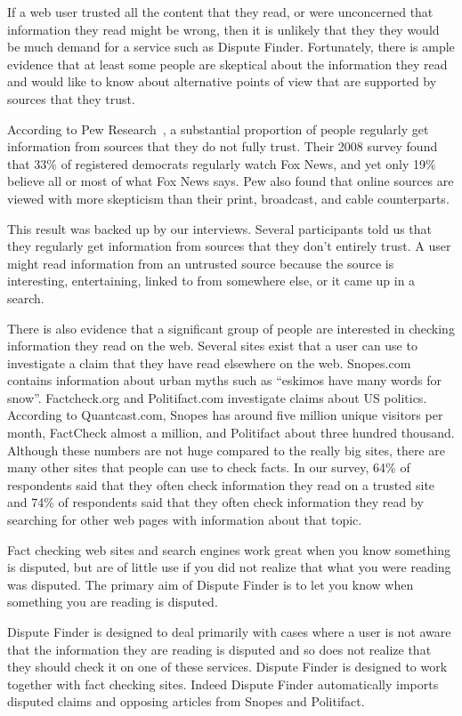 \documentclass{www2010-submission}
\begin{document}
If a web user trusted all the content that they read, or were unconcerned that information they read might be wrong, then it is unlikely that they they would be much demand for a service such as Dispute Finder. Fortunately, there is ample evidence that at least some people are skeptical about the information they read and would like to know about alternative points of view that are supported by sources that they trust.

According to Pew Research~\cite{PewResearch2008}, a substantial proportion of people regularly get information from sources that they do not fully trust. Their 2008 survey found that 33\% of registered democrats regularly watch Fox News, and yet only 19\% believe all or most of what Fox News says. Pew also found that online sources are viewed with more skepticism than their print, broadcast, and cable counterparts.

This result was backed up by our interviews. Several participants told us that they regularly get information from sources that they don't entirely trust. A user might read information from an untrusted source because the source is interesting, entertaining, linked to from somewhere else, or it came up in a search. 

There is also evidence that a significant group of people are interested in checking information they read on the web. Several sites exist that a user can use to investigate a claim that they have read elsewhere on the web. Snopes.com contains information about urban myths such as ``eskimos have many words for snow''. Factcheck.org and Politifact.com investigate claims about US politics. According to Quantcast.com, Snopes has around five million unique visitors per month, FactCheck almost a million, and Politifact about three hundred thousand. Although these numbers are not huge compared to the really big sites, there are many other sites that people can use to check facts. In our survey, 64\% of respondents said that they often check information they read on a trusted site and 74\% of respondents said that they often check information they read by searching for other web pages with information about that topic. 

Fact checking web sites and search engines work great when you know something is disputed, but are of little use if you did not realize that what you were reading was disputed. The primary aim of Dispute Finder is to let you know when something you are reading is disputed.

Dispute Finder is designed to deal primarily with cases where a user is not aware that the information they are reading is disputed and so does not realize that they should check it on one of these services. Dispute Finder is designed to work together with fact checking sites. Indeed Dispute Finder automatically imports disputed claims and opposing articles from Snopes and Politifact.
\end{document}
